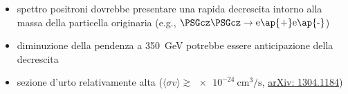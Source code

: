 \documentclass[10pt]{beamer}
\newcommand{\pro}{\color{alerted text.fg}{\ding{51}}}
\newcommand{\con}{\color{alerted text.fg}{\ding{55}}}
\begin{document}
\begin{frame}
\begin{itemize}
\begin{itemize}
    \item[\con] spettro positroni dovrebbe presentare una rapida decrescita
      intorno alla massa della particella originaria (e.g.,
      $\PSGcz \PSGcz \to \text{e\ap{+}e\ap{-}}$)
    \item[\pro] diminuzione della pendenza a \SI{350}{\giga\electronvolt}
      potrebbe essere anticipazione della decrescita
    \item[\con] sezione d'urto relativamente alta
      ($\langle \sigma v\rangle \gtrsim
      \SI{e-24}{\centi\metre\cubed\per\second}$,
      {
        \href{http://arxiv.org/abs/1304.1184}{arXiv: 1304.1184}})
    \end{itemize}
  \end{itemize}
\end{frame}

\section{\refname}

\begin{frame}
  \frametitle{\refname{}}
  \printbibliography{}
\end{frame}
\end{document}
